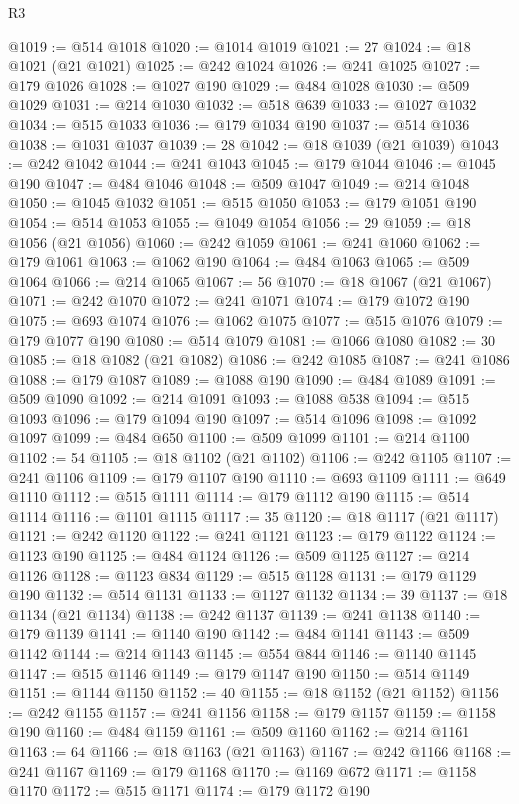 \begin{lexlean}{R3}
\begin{coremodule}
@1019 := @514 @1018
@1020 := @1014 @1019
@1021 := 27
@1024 := @18 @1021 (@21 @1021)
@1025 := @242 @1024
@1026 := @241 @1025
@1027 := @179 @1026
@1028 := @1027 @190
@1029 := @484 @1028
@1030 := @509 @1029
@1031 := @214 @1030
@1032 := @518 @639
@1033 := @1027 @1032
@1034 := @515 @1033
@1036 := @179 @1034 @190
@1037 := @514 @1036
@1038 := @1031 @1037
@1039 := 28
@1042 := @18 @1039 (@21 @1039)
@1043 := @242 @1042
@1044 := @241 @1043
@1045 := @179 @1044
@1046 := @1045 @190
@1047 := @484 @1046
@1048 := @509 @1047
@1049 := @214 @1048
@1050 := @1045 @1032
@1051 := @515 @1050
@1053 := @179 @1051 @190
@1054 := @514 @1053
@1055 := @1049 @1054
@1056 := 29
@1059 := @18 @1056 (@21 @1056)
@1060 := @242 @1059
@1061 := @241 @1060
@1062 := @179 @1061
@1063 := @1062 @190
@1064 := @484 @1063
@1065 := @509 @1064
@1066 := @214 @1065
@1067 := 56
@1070 := @18 @1067 (@21 @1067)
@1071 := @242 @1070
@1072 := @241 @1071
@1074 := @179 @1072 @190
@1075 := @693 @1074
@1076 := @1062 @1075
@1077 := @515 @1076
@1079 := @179 @1077 @190
@1080 := @514 @1079
@1081 := @1066 @1080
@1082 := 30
@1085 := @18 @1082 (@21 @1082)
@1086 := @242 @1085
@1087 := @241 @1086
@1088 := @179 @1087
@1089 := @1088 @190
@1090 := @484 @1089
@1091 := @509 @1090
@1092 := @214 @1091
@1093 := @1088 @538
@1094 := @515 @1093
@1096 := @179 @1094 @190
@1097 := @514 @1096
@1098 := @1092 @1097
@1099 := @484 @650
@1100 := @509 @1099
@1101 := @214 @1100
@1102 := 54
@1105 := @18 @1102 (@21 @1102)
@1106 := @242 @1105
@1107 := @241 @1106
@1109 := @179 @1107 @190
@1110 := @693 @1109
@1111 := @649 @1110
@1112 := @515 @1111
@1114 := @179 @1112 @190
@1115 := @514 @1114
@1116 := @1101 @1115
@1117 := 35
@1120 := @18 @1117 (@21 @1117)
@1121 := @242 @1120
@1122 := @241 @1121
@1123 := @179 @1122
@1124 := @1123 @190
@1125 := @484 @1124
@1126 := @509 @1125
@1127 := @214 @1126
@1128 := @1123 @834
@1129 := @515 @1128
@1131 := @179 @1129 @190
@1132 := @514 @1131
@1133 := @1127 @1132
@1134 := 39
@1137 := @18 @1134 (@21 @1134)
@1138 := @242 @1137
@1139 := @241 @1138
@1140 := @179 @1139
@1141 := @1140 @190
@1142 := @484 @1141
@1143 := @509 @1142
@1144 := @214 @1143
@1145 := @554 @844
@1146 := @1140 @1145
@1147 := @515 @1146
@1149 := @179 @1147 @190
@1150 := @514 @1149
@1151 := @1144 @1150
@1152 := 40
@1155 := @18 @1152 (@21 @1152)
@1156 := @242 @1155
@1157 := @241 @1156
@1158 := @179 @1157
@1159 := @1158 @190
@1160 := @484 @1159
@1161 := @509 @1160
@1162 := @214 @1161
@1163 := 64
@1166 := @18 @1163 (@21 @1163)
@1167 := @242 @1166
@1168 := @241 @1167
@1169 := @179 @1168
@1170 := @1169 @672
@1171 := @1158 @1170
@1172 := @515 @1171
@1174 := @179 @1172 @190

\end{coremodule}
\end{lexlean}
